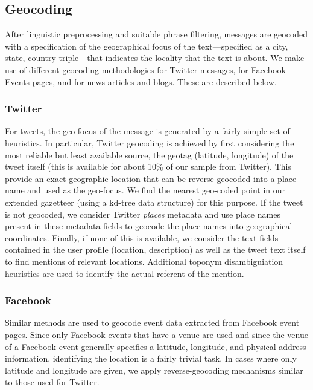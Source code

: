 \vspace{-0.5em}
\subsection{Geocoding}
\label{subsection:geocoding}
After linguistic preprocessing and suitable phrase filtering,
messages are geocoded with a
specification of the geographical focus of the text---specified as a
city, state, country triple---that indicates the locality that the
text is about. We make use of different geocoding methodologies
for Twitter messages, for Facebook Events pages, and for news articles and blogs.
These are described below.

\subsubsection{Twitter}
For tweets, the geo-focus of the message is generated by a fairly
simple set of heuristics.  In particular, Twitter
geocoding is achieved by first considering the most reliable but least
available source, the geotag (latitude, longitude) of the tweet itself (this is available
for about 10\% of our sample from Twitter). This provide an exact
geographic location that can be reverse geocoded into a place name
and used as the geo-focus. We find the nearest geo-coded point in
our extended gazetteer (using a kd-tree data structure) for this
purpose. If the tweet is not geocoded, we consider Twitter {\it places}
metadata and use place names present in these metadata fields to
geocode the place names into geographical coordinates. Finally, if
none of this is available, we consider the text fields contained in
the user profile (location, description) as well as the tweet text
itself to find mentions of relevant locations.  Additional toponym disambiguiation heuristics are used to
identify the actual referent of the mention.

\subsubsection{Facebook}
Similar methods are used to geocode event data extracted from Facebook event pages.  
Since only Facebook events that have a venue are used and since the
 venue of a Facebook event generally specifies a latitude, longitude, and physical address information, 
identifying the location is a fairly trivial task.  In cases where only latitude and longitude are given, 
we apply reverse-geocoding mechanisms similar to those used for Twitter.


